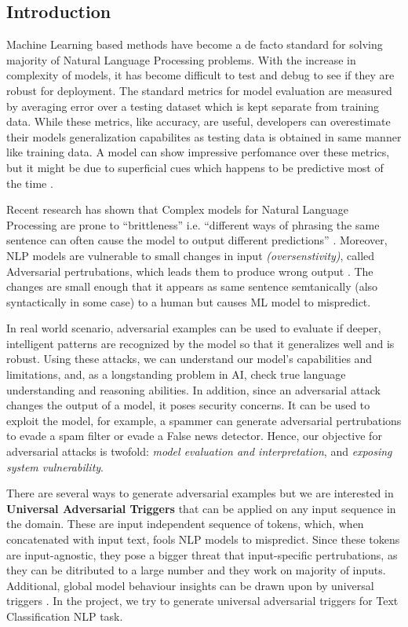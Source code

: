 \documentclass[12pt]{report}
\begin{document}


\begin{spacing}{1.5}
\chapter{Introduction}

Machine Learning based methods have become a de facto standard for solving majority of Natural Language Processing problems. 
With the increase in complexity of models, it has become difficult to test and debug to see if they are robust for deployment.
The standard metrics for model evaluation are measured by averaging error over a testing dataset which is kept separate from training data.
While these metrics, like accuracy, are useful, developers can overestimate their models generalization capabilites as testing data is obtained in same manner like training data.
A  model can show impressive perfomance over these metrics, but it might be due to superficial cues which happens to be predictive most of the time \cite{jia2019}.

Recent research has shown that Complex models for Natural Language Processing are prone to ``brittleness'' i.e. ``different ways of phrasing the same sentence can often cause the model to output different predictions'' \cite{riberio2018}.
Moreover, NLP models are vulnerable to small changes in input \textit{(oversenstivity)}, called Adversarial pertrubations, which leads them to produce wrong output \cite{liang2018}.
The changes are small enough that it appears as same sentence semtanically (also syntactically in some case) to a human but causes ML model to mispredict.

In real world scenario, adversarial examples can be used to evaluate if deeper, intelligent patterns are recognized by the model so that it generalizes well and is robust.
Using these attacks, we can understand our model's capabilities and limitations, and, as a longstanding problem in AI, check true language understanding and reasoning abilities.
In addition, since an adversarial attack changes the output of a model, it poses security concerns. It can be used to exploit the model, for example, a spammer can generate adversarial pertrubations to evade a spam filter or evade a False news detector.
Hence, our objective for adversarial attacks is twofold: \textit{model evaluation and interpretation}, and \textit{exposing system vulnerability}.

There are several ways to generate adversarial examples but we are interested in \textbf{Universal Adversarial Triggers} that can be applied on any input sequence in the domain.
These are input independent sequence of tokens, which, when concatenated with input text, fools NLP models to mispredict. Since these tokens are input-agnostic, they pose a bigger threat that input-specific pertrubations, as they can be ditributed to a large number and they work on majority of inputs. Additional, global model behaviour insights can be drawn upon by universal triggers \cite{wallace2019}. In the project, we try to generate universal adversarial triggers for Text Classification NLP task.


\end{spacing}
\end{document}

